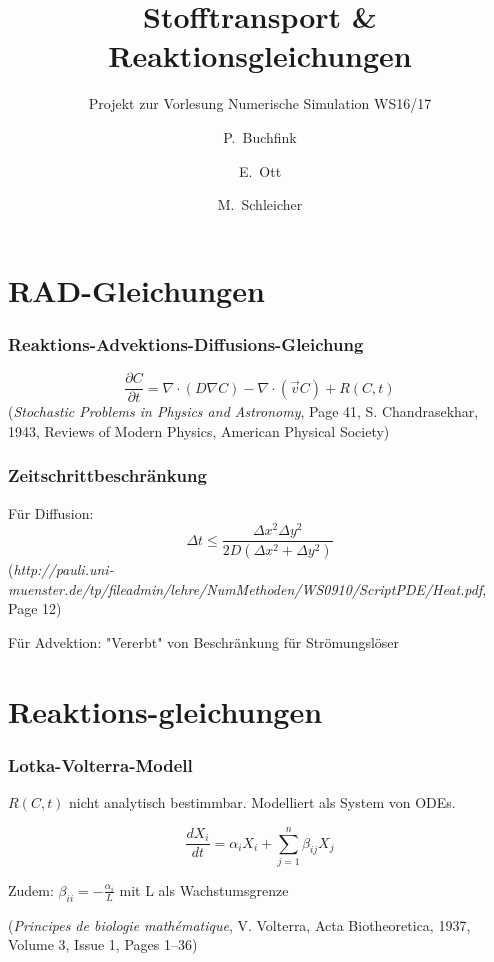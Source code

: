 \documentclass[12pt]{beamer}
\title{Stofftransport \& Reaktionsgleichungen}
\subtitle{Projekt zur Vorlesung Numerische Simulation WS16/17}
\author{P.~Buchfink\inst{1} \and E.~Ott\inst{1} \and M.~Schleicher\inst{1}}
\institute
{
  \inst{1}
  Institut \\
  Universität Stuttgart
}
\begin{document}
  \begin{frame}
    \titlepage
  \end{frame}

  \section{RAD-Gleichungen}
    \begin{frame}
      \frametitle{Reaktions-Advektions-Diffusions-Gleichung}
      $$\frac{\partial C}{\partial t} = \nabla \cdot (D \nabla C) - \nabla \cdot (\vec{v} C) + R(C,t)$$
      {\tiny (\emph{Stochastic Problems in Physics and Astronomy}, Page 41, S. Chandrasekhar, 1943, Reviews of Modern Physics, American Physical Society)}
    \end{frame}

    \begin{frame}
      \frametitle{Zeitschrittbeschränkung}
      Für Diffusion:
      $$\Delta t \leq \frac{\Delta x^2 \Delta y^2}{2D(\Delta x^2 + \Delta y^2)}$$
      {\tiny (\emph{http://pauli.uni-muenster.de/tp/fileadmin/lehre/NumMethoden/WS0910/ScriptPDE/Heat.pdf}, Page 12)}
      
      Für Advektion: "Vererbt" von Beschränkung für Strömungslöser
    \end{frame}

  \section{Reaktions-gleichungen}
    \begin{frame}
    \frametitle{Lotka-Volterra-Modell}
    $R(C,t)$ nicht analytisch bestimmbar. Modelliert als System von ODEs.
    
    $$\frac{dX_i}{dt} = \alpha_i X_i + \sum_{j=1}^{n} \beta_{ij} X_j$$
    
    Zudem: $\beta_{ii} = -\frac{\alpha_i}{L}$ mit L als Wachstumsgrenze
    
    {\tiny (\emph{Principes de biologie mathématique}, V. Volterra, Acta Biotheoretica, 1937, Volume 3, Issue 1, Pages 1–36)}
    \end{frame}
    
\end{document}
